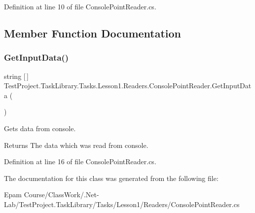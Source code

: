 Definition at line 10 of file Console\+Point\+Reader.\+cs.



\subsection{Member Function Documentation}
\mbox{\label{class_test_project_1_1_task_library_1_1_tasks_1_1_lesson1_1_1_readers_1_1_console_point_reader_a305558af0d9b26c2662a7eaabaa69e46}} 
\subsubsection{\texorpdfstring{GetInputData()}{GetInputData()}}
{\footnotesize\ttfamily string \mbox{[}$\,$\mbox{]} Test\+Project.\+Task\+Library.\+Tasks.\+Lesson1.\+Readers.\+Console\+Point\+Reader.\+Get\+Input\+Data (\begin{DoxyParamCaption}{ }\end{DoxyParamCaption})}



Gets data from console. 

\begin{DoxyReturn}{Returns}
The data which was read from console.
\end{DoxyReturn}


Definition at line 16 of file Console\+Point\+Reader.\+cs.



The documentation for this class was generated from the following file\+:\begin{DoxyCompactItemize}
\item 
Epam Course/\+Class\+Work/.\+Net-\/\+Lab/\+Test\+Project.\+Task\+Library/\+Tasks/\+Lesson1/\+Readers/Console\+Point\+Reader.\+cs\end{DoxyCompactItemize}
